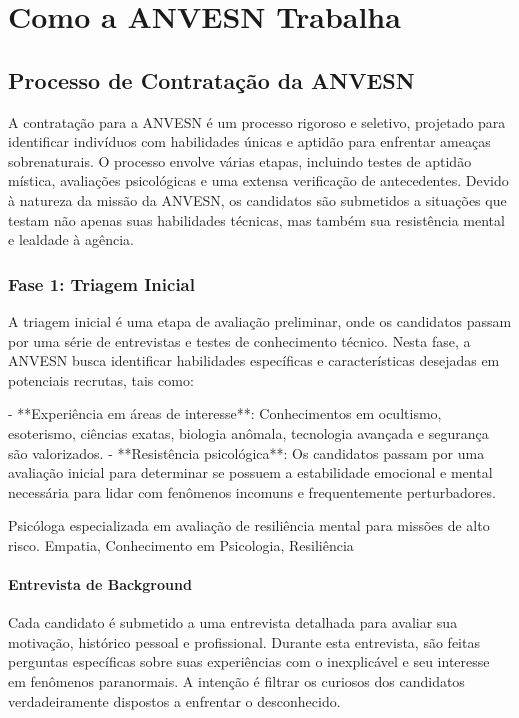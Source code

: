 \part{Como a ANVESN Trabalha}

\chapter{Processo de Contratação da ANVESN}

A contratação para a ANVESN é um processo rigoroso e seletivo, projetado para identificar indivíduos com habilidades únicas e aptidão para enfrentar ameaças sobrenaturais. O processo envolve várias etapas, incluindo testes de aptidão mística, avaliações psicológicas e uma extensa verificação de antecedentes. Devido à natureza da missão da ANVESN, os candidatos são submetidos a situações que testam não apenas suas habilidades técnicas, mas também sua resistência mental e lealdade à agência.

\section{Fase 1: Triagem Inicial}
A triagem inicial é uma etapa de avaliação preliminar, onde os candidatos passam por uma série de entrevistas e testes de conhecimento técnico. Nesta fase, a ANVESN busca identificar habilidades específicas e características desejadas em potenciais recrutas, tais como:

- **Experiência em áreas de interesse**: Conhecimentos em ocultismo, esoterismo, ciências exatas, biologia anômala, tecnologia avançada e segurança são valorizados.
- **Resistência psicológica**: Os candidatos passam por uma avaliação inicial para determinar se possuem a estabilidade emocional e mental necessária para lidar com fenômenos incomuns e frequentemente perturbadores.

{Psicóloga especializada em avaliação de resiliência mental para missões de alto risco.}
{Empatia, Conhecimento em Psicologia, Resiliência}

\subsection{Entrevista de Background}
Cada candidato é submetido a uma entrevista detalhada para avaliar sua motivação, histórico pessoal e profissional. Durante esta entrevista, são feitas perguntas específicas sobre suas experiências com o inexplicável e seu interesse em fenômenos paranormais. A intenção é filtrar os curiosos dos candidatos verdadeiramente dispostos a enfrentar o desconhecido.

